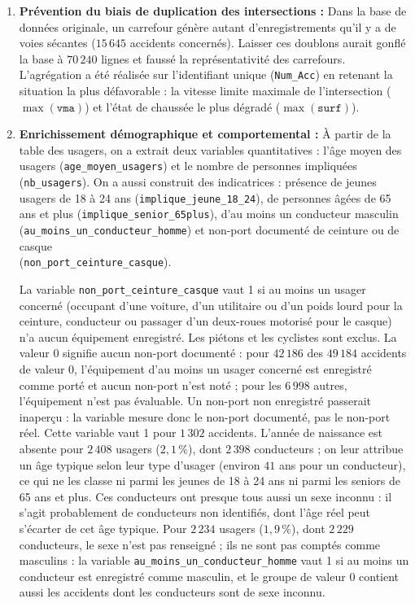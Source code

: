 \documentclass[11pt,a4paper]{article}
\begin{document}
\begin{enumerate}
    \item \textbf{Prévention du biais de duplication des intersections :}
    Dans la base de données originale, un carrefour génère autant d'enregistrements qu'il y a de voies sécantes ($15\,645$ accidents concernés). Laisser ces doublons aurait gonflé la base à $70\,240$ lignes et faussé la représentativité des carrefours. L'agrégation a été réalisée sur l'identifiant unique (\texttt{Num\_Acc}) en retenant la situation la plus défavorable : la vitesse limite maximale de l'intersection ($\max(\texttt{vma})$) et l'état de chaussée le plus dégradé ($\max(\texttt{surf})$).

    \item \textbf{Enrichissement démographique et comportemental :}
    À partir de la table des usagers, on a extrait deux variables quantitatives : l'âge moyen des usagers (\texttt{age\_moyen\_usagers}) et le nombre de personnes impliquées (\texttt{nb\_usagers}). On a aussi construit des indicatrices : présence de jeunes usagers de 18 à 24 ans (\texttt{implique\_jeune\_18\_24}), de personnes âgées de 65 ans et plus (\texttt{implique\_senior\_65plus}), d'au moins un conducteur masculin (\texttt{au\_moins\_un\_conducteur\_homme}) et non-port documenté de ceinture ou de casque \\ (\texttt{non\_port\_ceinture\_casque}).

    La variable \texttt{non\_port\_ceinture\_casque} vaut 1 si au moins un usager concerné (occupant d'une voiture, d'un utilitaire ou d'un poids lourd pour la ceinture, conducteur ou passager d'un deux-roues motorisé pour le casque) n'a aucun équipement enregistré. Les piétons et les cyclistes sont exclus. La valeur 0 signifie \og aucun non-port documenté\fg{} : pour $42\,186$ des $49\,184$ accidents de valeur 0, l'équipement d'au moins un usager concerné est enregistré comme porté et aucun non-port n'est noté ; pour les $6\,998$ autres, l'équipement n'est pas évaluable. Un non-port non enregistré passerait inaperçu : la variable mesure donc le non-port documenté, pas le non-port réel. Cette variable vaut 1 pour $1\,302$ accidents.
    L'année de naissance est absente pour $2\,408$ usagers ($2{,}1\,\%$), dont $2\,398$ conducteurs ; on leur attribue un âge typique selon leur type d'usager (environ $41$ ans pour un conducteur), ce qui ne les classe ni parmi les jeunes de 18 à 24 ans ni parmi les seniors de 65 ans et plus. Ces conducteurs ont presque tous aussi un sexe inconnu : il s'agit probablement de conducteurs non identifiés, dont l'âge réel peut s'écarter de cet âge typique. Pour $2\,234$ usagers ($1{,}9\,\%$), dont $2\,229$ conducteurs, le sexe n'est pas renseigné ; ils ne sont pas comptés comme masculins : la variable \texttt{au\_moins\_un\_conducteur\_homme} vaut 1 si au moins un conducteur est enregistré comme masculin, et le groupe de valeur 0 contient aussi les accidents dont les conducteurs sont de sexe inconnu.
    

\end{enumerate}
\end{document}
